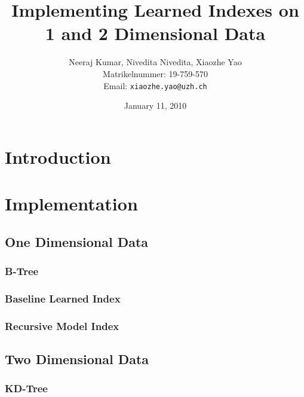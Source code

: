 \documentclass[a4paper,12pt]{scrreprt}
\title{Implementing Learned Indexes on 1 and 2 Dimensional Data}
\author{
  Neeraj Kumar, Nivedita Nivedita, Xiaozhe Yao\\[-5pt]
  \scriptsize Matrikelnummer: 19-759-570\\[-5pt]
  \scriptsize Email: \texttt{xiaozhe.yao@uzh.ch}
}
\date{\vspace*{2cm}January 11, 2010}
\begin{document}
\begingroup
\let\newpage\relax%
\maketitle
\newpage\null\thispagestyle{blank}\newpage
\setcounter{page}{0}
\endgroup

\begin{abstract}

\end{abstract}

\setcounter{tocdepth}{2}
\tableofcontents 

\chapter{Introduction}



\chapter{Implementation}

\section{One Dimensional Data}

\subsection{B-Tree}



\subsection{Baseline Learned Index}



\subsection{Recursive Model Index}



\section{Two Dimensional Data}

\subsection{KD-Tree}
\end{document}
